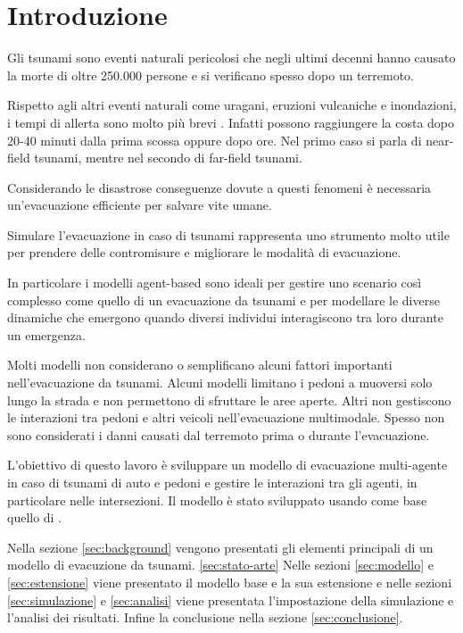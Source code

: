 \section{Introduzione}
Gli tsunami sono eventi naturali pericolosi che negli ultimi decenni 
hanno causato la morte di oltre 250.000 persone e si verificano spesso 
dopo un terremoto.

Rispetto agli altri eventi naturali come uragani, eruzioni vulcaniche e inondazioni, 
i tempi di allerta sono molto più brevi \parencite{katada2006integrated}.
%
Infatti possono raggiungere la costa dopo 20-40 minuti dalla prima scossa oppure dopo ore.
Nel primo caso si parla di near-field tsunami, mentre nel secondo di far-field tsunami. 

Considerando le disastrose conseguenze dovute a questi fenomeni è necessaria un'evacuazione efficiente per salvare vite umane. 

Simulare l'evacuazione in caso di tsunami rappresenta uno strumento molto utile per 
prendere delle contromisure e migliorare le modalità di evacuazione.

In particolare i modelli agent-based sono ideali per gestire uno scenario così complesso come quello di un evacuazione da tsunami e
per modellare le diverse dinamiche che emergono quando diversi individui interagiscono tra loro durante un emergenza. 

Molti modelli non considerano o semplificano alcuni fattori importanti nell'evacuazione da tsunami.
Alcuni modelli limitano i pedoni a muoversi solo lungo la strada e non permettono di sfruttare le aree aperte. 
Altri non gestiscono le interazioni tra pedoni e altri veicoli nell'evacuazione multimodale.
%
Spesso non sono considerati i danni causati dal terremoto prima o durante l'evacuazione.

L'obiettivo di questo lavoro è sviluppare un modello di evacuazione multi-agente in caso di tsunami
di auto e pedoni e gestire le interazioni tra gli agenti, 
in particolare nelle intersezioni.
%
Il modello è stato sviluppato usando come base quello di \textcite{mostafizi2019agent}.


Nella sezione \ref{sec:background} vengono presentati gli elementi principali di un modello di evacuzione da tsunami.
\ref{sec:stato-arte}
%
Nelle sezioni \ref{sec:modello} e \ref{sec:estensione} viene presentato il modello base e la sua estensione e 
nelle sezioni \ref{sec:simulazione} e \ref{sec:analisi} viene presentata l'impostazione della simulazione e 
l'analisi dei risultati.
%
Infine la conclusione nella sezione \ref{sec:conclusione}.

\newpage
